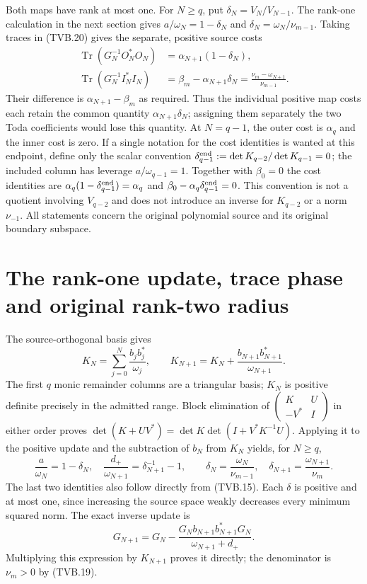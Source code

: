 \documentclass[11pt]{article}
\newcommand{\tr}{\operatorname{Tr}}
\begin{document}
Both maps have rank at most one. For $N\ge q$, put
$\delta_N=V_N/V_{N-1}$. The rank-one calculation in the next
section gives $a/\omega_N=1-\delta_N$ and
$\delta_N=\omega_N/\nu_{m-1}$. Taking traces in (TVB.20) gives
the separate, positive source costs
\[
 \begin{split}
 \tr(G_N^{-1}O_N^*O_N)&=\alpha_{N+1}(1-\delta_N),\\
 \tr(G_N^{-1}I_N^*I_N)&=\beta_m-\alpha_{N+1}\delta_N
                   =\frac{\nu_m-\omega_{N+1}}{\nu_{m-1}}.
 \end{split}
 \tag{TVB.21}
\]
Their difference is $\alpha_{N+1}-\beta_m$ as required.
Thus the individual positive map costs each retain the common
quantity $\alpha_{N+1}\delta_N$; assigning them separately
the two Toda coefficients would lose this quantity.
At $N=q-1$, the outer cost is $\alpha_q$ and the inner cost is
zero. If a single notation for the cost identities is wanted at
this endpoint, define only the scalar convention
$\delta_{q-1}^{\rm end}:=\det K_{q-2}/\det K_{q-1}=0$;
the included column has leverage $a/\omega_{q-1}=1$.
Together with $\beta_0=0$ the cost identities are
$\alpha_q(1-\delta_{q-1}^{\rm end})=\alpha_q$ and
$\beta_0-\alpha_q\delta_{q-1}^{\rm end}=0$.
This convention is not a quotient involving $V_{q-2}$ and does
not introduce an inverse for $K_{q-2}$ or a norm $\nu_{-1}$.
All statements concern the original polynomial source and its
original boundary subspace.

\section{The rank-one update, trace phase and original rank-two radius}

The source-orthogonal basis gives
\[
 K_N=\sum_{j=0}^N\frac{b_jb_j^*}{\omega_j},\qquad
 K_{N+1}=K_N+\frac{b_{N+1}b_{N+1}^*}{\omega_{N+1}}.
 \tag{TVB.22}
\]
The first $q$ monic remainder columns are a triangular basis;
$K_N$ is positive definite precisely in the admitted range.
Block elimination of
$\left(\begin{smallmatrix}K&U\\-V^*&I\end{smallmatrix}\right)$
in either order proves
$\det(K+UV^*)=\det K\det(I+V^*K^{-1}U)$.
Applying it to the positive update and the subtraction of $b_N$
from $K_N$ yields, for $N\ge q$,
\[
 \frac a{\omega_N}=1-\delta_N,\quad
 \frac{d_+}{\omega_{N+1}}=\delta_{N+1}^{-1}-1,\qquad
 \delta_N=\frac{\omega_N}{\nu_{m-1}},\quad
 \delta_{N+1}=\frac{\omega_{N+1}}{\nu_m}.
 \tag{TVB.23}
\]
The last two identities also follow directly from (TVB.15).
Each $\delta$ is positive and at most one, since increasing the
source space weakly decreases every minimum squared norm.
The exact inverse update is
\[
 G_{N+1}=G_N-
 \frac{G_Nb_{N+1}b_{N+1}^*G_N}{\omega_{N+1}+d_+}.
 \tag{TVB.24}
\]
Multiplying this expression by $K_{N+1}$ proves it directly;
the denominator is $\nu_m>0$ by (TVB.19).
\end{document}
